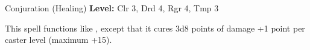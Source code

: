 {Conjuration (Healing)}
{
	\textbf{Level:}
	Clr 3, Drd 4, Rgr 4, Tmp 3\\
}
{
	This spell functions like , except that it cures 3d8 points of damage +1 point per caster level (maximum +15).

}
